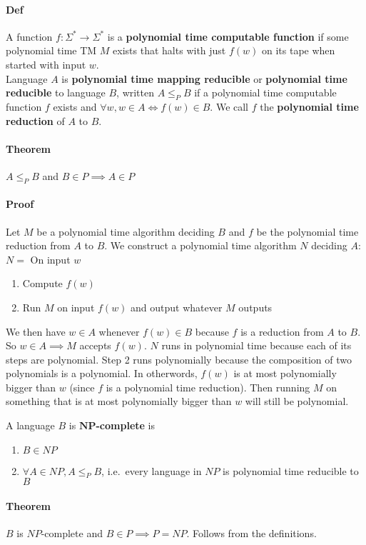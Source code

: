 \documentclass[12 pt]{article}
\begin{document}
\paragraph{Def}
A function $f:\Sigma^* \to \Sigma^*$ is a \textbf{polynomial time
  computable function} if some polynomial time TM $M$ exists that
halts with just $f(w)$ on its tape when started with input $w$.
\\ Language $A$ is \textbf{polynomial time mapping reducible} or
\textbf{polynomial time reducible} to language $B$, written $A \leq_P
B$ if a polynomial time computable function $f$ exists and $\forall w, w
\in A \iff f(w) \in B$. We call $f$ the \textbf{polynomial time
  reduction} of $A$ to $B$.
\paragraph{Theorem} $A \leq_P B$ and $B \in P \implies A \in P$
\paragraph{Proof} Let $M$ be a polynomial time algorithm deciding $B$
and $f$ be the polynomial time reduction from $A$ to $B$. We construct
a polynomial time algorithm $N$ deciding $A$:
\\ $N =$ On input $w$
\begin{enumerate}
\item Compute $f(w)$
\item Run $M$ on input $f(w)$ and output whatever $M$ outputs
\end{enumerate}
We then have $w \in A$ whenever $f(w) \in B$ because $f$ is a
reduction from $A$ to $B$. So $w \in A \implies M$ accepts $f(w)$. $N$
runs in polynomial time because each of its steps are polynomial. Step
2 runs polynomially because the composition of two polynomials is a
polynomial. In otherwords, $f(w)$ is at most polynomially bigger than
$w$ (since $f$ is a polynomial time reduction). Then running $M$ on
something that is at most polynomially bigger than $w$ will still be
polynomial.

A language $B$ is $\mathbf{NP}$\textbf{-complete} is
\begin{enumerate}
\item $B \in NP$
\item $\forall A \in NP, A \leq_{P} B$, i.e.\ every language in $NP$
  is polynomial time reducible to $B$
\end{enumerate}
\paragraph{Theorem} $B$ is $NP$-complete and $B \in P \implies P =
NP$. Follows from the definitions.
\end{document}
